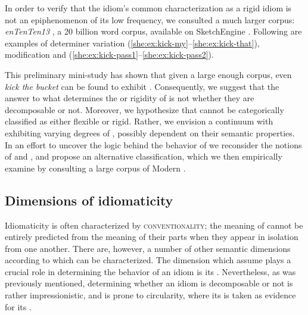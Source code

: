 \documentclass[output=paper]{langsci/langscibook}
\begin{document}
In order to verify that the idiom's common characterization as a rigid idiom is not an epiphenomenon of its low frequency, we consulted a much larger corpus: \emph{enTenTen13} \citep{baroni-bernardini-ferraresi-zanchetta-2009}, a 20 billion word  corpus, available on SketchEngine \citep{sketchengine}. Following are examples of determiner variation (\ref{she:ex:kick-my}--\ref{she:ex:kick-that}), modification  and  (\ref{she:ex:kick-pass1}--\ref{she:ex:kick-pass2}).

\eal
\zl

This preliminary mini-study has shown that given a large enough corpus, even \textit{kick the bucket} can be found to exhibit . Consequently, we suggest that the answer to what determines the  or rigidity of  is not whether they are decomposable or not. Moreover, we hypothesize that  cannot be categorically classified as either flexible or rigid. Rather, we envision a continuum with  exhibiting varying degrees of , possibly dependent on their semantic properties.
In an effort to uncover the logic behind the behavior of  we reconsider the notions of  and , and propose an alternative classification, which we then empirically examine by consulting a large corpus of Modern .


\subsection{Dimensions of idiomaticity}
\label{she:sec:semantic-class}
Idiomaticity is often characterized by {\scshape conventionality}; the meaning of  cannot be entirely predicted from the meaning of their parts when they appear in isolation from one another. There are, however, a number of other semantic dimensions according to which  can be characterized. The dimension which \citet[498]{nunberg94} assume plays a crucial role in determining the behavior of an idiom is its . Nevertheless, as was previously mentioned, determining whether an idiom is decomposable or not is rather impressionistic, and is prone to circularity, where its  is taken as evidence for its .
\end{document}
